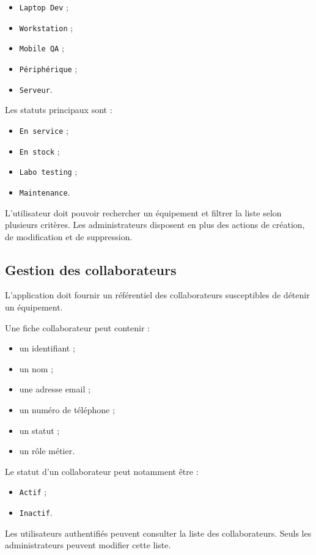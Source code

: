 \documentclass{rapportENSIAS}
\begin{document}
\begin{itemize}
\item \texttt{Laptop Dev} ;
\item \texttt{Workstation} ;
\item \texttt{Mobile QA} ;
\item \texttt{Périphérique} ;
\item \texttt{Serveur}.
\end{itemize}

Les statuts principaux sont :

\begin{itemize}
\item \texttt{En service} ;
\item \texttt{En stock} ;
\item \texttt{Labo testing} ;
\item \texttt{Maintenance}.
\end{itemize}

L’utilisateur doit pouvoir rechercher un équipement et filtrer la liste selon plusieurs critères. Les administrateurs disposent en plus des actions de création, de modification et de suppression.

\subsection{Gestion des collaborateurs}

L’application doit fournir un référentiel des collaborateurs susceptibles de détenir un équipement.

Une fiche collaborateur peut contenir :

\begin{itemize}
\item un identifiant ;
\item un nom ;
\item une adresse email ;
\item un numéro de téléphone ;
\item un statut ;
\item un rôle métier.
\end{itemize}

Le statut d’un collaborateur peut notamment être :

\begin{itemize}
\item \texttt{Actif} ;
\item \texttt{Inactif}.
\end{itemize}

Les utilisateurs authentifiés peuvent consulter la liste des collaborateurs. Seuls les administrateurs peuvent modifier cette liste.
\end{document}
